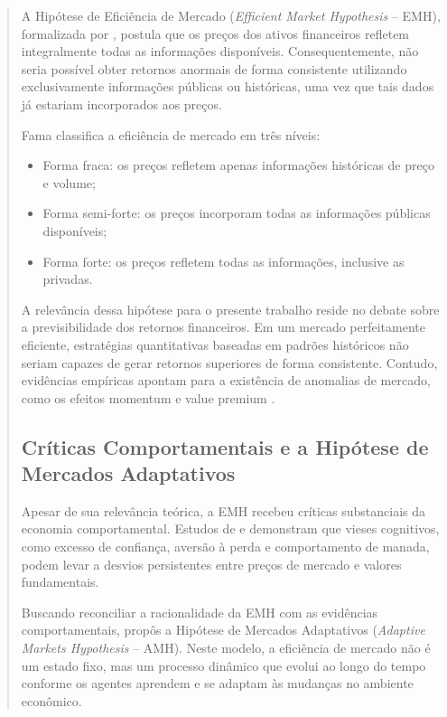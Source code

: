 \documentclass{eic-bcc-tcc}
\begin{document}
\begin{abstract}
A Hipótese de Eficiência de Mercado (\textit{Efficient Market Hypothesis} -- EMH), formalizada por \citep{Fama1970}, postula que os preços dos ativos financeiros refletem integralmente todas as informações disponíveis. Consequentemente, não seria possível obter retornos anormais de forma consistente utilizando exclusivamente informações públicas ou históricas, uma vez que tais dados já estariam incorporados aos preços.

Fama \citep{Fama1970} classifica a eficiência de mercado em três níveis:

\begin{itemize}
\item Forma fraca: os preços refletem apenas informações históricas de preço e volume;
\item Forma semi-forte: os preços incorporam todas as informações públicas disponíveis;
\item Forma forte: os preços refletem todas as informações, inclusive as privadas.
\end{itemize}

A relevância dessa hipótese para o presente trabalho reside no debate sobre a previsibilidade dos retornos financeiros. Em um mercado perfeitamente eficiente, estratégias quantitativas baseadas em padrões históricos não seriam capazes de gerar retornos superiores de forma consistente. Contudo, evidências empíricas apontam para a existência de anomalias de mercado, como os efeitos momentum e value premium \citep{FamaFrench1992, JegadeeshTitman1993}.

\subsection{Críticas Comportamentais e a Hipótese de Mercados Adaptativos}

Apesar de sua relevância teórica, a EMH recebeu críticas substanciais da economia comportamental. Estudos de \citep{Shiller2000} e \citep{Thaler1993} demonstram que vieses cognitivos, como excesso de confiança, aversão à perda e comportamento de manada, podem levar a desvios persistentes entre preços de mercado e valores fundamentais.

Buscando reconciliar a racionalidade da EMH com as evidências comportamentais, \citet{Lo2004} propôs a Hipótese de Mercados Adaptativos (\textit{Adaptive Markets Hypothesis} -- AMH). Neste modelo, a eficiência de mercado não é um estado fixo, mas um processo dinâmico que evolui ao longo do tempo conforme os agentes aprendem e se adaptam às mudanças no ambiente econômico.


\end{abstract}
\end{document}
